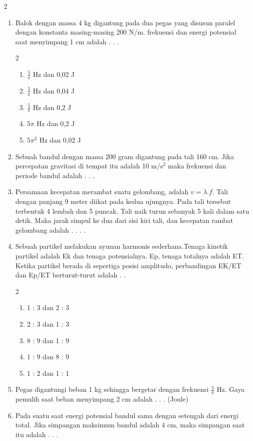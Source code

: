 \documentclass[10pt,a4paper]{extarticle}
\newcommand{\pilgani}[1]{                            \vspace{-0.3cm}\begin{multicols}{2}
 \begin{enumerate}[label=\Alph*., itemsep=0pt,topsep=0pt,leftmargin=*,align=Center]#1                     \end{enumerate}
 \phantom{ini cuma sapi, wedus, dan ayam}
 \end{multicols}}
\begin{document}
\begin{multicols*}{2}
\begin{enumerate}
\item Balok dengan massa 4 kg digantung pada dua pegas yang disusun paralel dengan konstanta masing-masing 200 N/m. frekuensi dan energi potensial saat menyimpang 1 cm adalah . . . 
\pilgani{
   \item $\frac{5}{\pi}$ Hz dan 0,02 J
   \item $\frac{5}{\pi}$ Hz dan 0,04 J
   \item $\frac{5}{\pi}$ Hz dan 0,2 J
   \item $5\pi$ Hz dan 0,2 J
   \item $5\pi^2$ Hz dan 0,02 J}
\vspace{3cm}

\item Sebuah bandul dengan massa 200 gram digantung pada tali 160 cm. Jika percepatan gravitasi di tempat itu adalah 10 m/s$^2$ maka frekuensi dan periode bandul adalah . . . 
\vspace{1cm}

\item Persamaan kecepatan merambat suatu gelombang, adalah $v = \lambda .f$. Tali dengan panjang 9 meter diikat pada kedua ujungnya. Pada tali tersebut terbentuk 4 lembah dan 5 puncak. Tali naik turun sebanyak 5 kali dalam satu detik. Maka jarak simpul ke dua dari sisi kiri tali, dan kecepatan rambat gelombang adalah . . . .
\vspace{3cm}

\item Sebuah partikel melakukan ayunan harmonis sederhana.Tenaga kinetik partikel adalah Ek dan tenaga potensialnya. Ep, tenaga totalnya adalah ET. Ketika partikel berada di sepertiga posisi amplitudo, perbandingan EK/ET dan Ep/ET berturut-turut adalah . . 
\pilgani{
   \item 1 : 3 dan 2 : 3
   \item 2 : 3 dan 1 : 3
   \item 8 : 9 dan 1 : 9
   \item 1 : 9 dan 8 : 9
   \item 1 : 2 dan 1 : 1
}
\vspace{2cm}

\item Pegas digantungi beban 1 kg sehingga bergetar dengan frekuensi $\frac{5}{\pi}$ Hz. Gaya pemulih saat beban menyimpang 2 cm adalah . . . (Joule)
\vspace{2cm}

\item Pada suatu saat energi potensial bandul sama dengan setengah dari energi total. Jika simpangan maksimum bandul adalah 4 cm, maka simpangan saat itu adalah . . .
   

\end{enumerate}
\end{multicols*}
\end{document}
